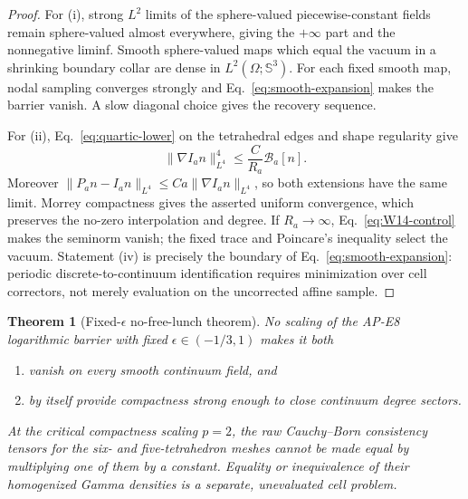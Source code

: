 \documentclass[11pt]{article}
\numberwithin{equation}{section}
\newtheorem{theorem}{Theorem}[section]
\theoremstyle{definition}
\theoremstyle{remark}
\newcommand{\SSS}{\mathbb S}
\newcommand{\cB}{\mathcal B}
\begin{document}
\begin{proof}
For (i), strong $L^2$ limits of the sphere-valued piecewise-constant fields
remain sphere-valued almost everywhere, giving the $+\infty$ part and the
nonnegative liminf.  Smooth sphere-valued maps which equal the vacuum in a
shrinking boundary collar are dense in $L^2(\Omega;\SSS^3)$.  For each fixed
smooth map, nodal sampling converges strongly and
Eq.~\eqref{eq:smooth-expansion} makes the barrier vanish.  A slow diagonal
choice gives the recovery sequence.

For (ii), Eq.~\eqref{eq:quartic-lower} on the tetrahedral edges and shape
regularity give
\begin{equation}
 \|\nabla I_an\|_{L^4}^4
 \le \frac{C}{R_a}\cB_a[n].
 \label{eq:W14-control}
\end{equation}
Moreover
$\|P_an-I_an\|_{L^4}\le Ca\|\nabla I_an\|_{L^4}$, so both extensions have
the same limit.  Morrey compactness gives the asserted uniform convergence,
which preserves the no-zero interpolation and degree.  If $R_a\to\infty$,
Eq.~\eqref{eq:W14-control} makes the seminorm vanish; the fixed trace and
Poincare's inequality select the vacuum.  Statement (iv) is precisely the
boundary of Eq.~\eqref{eq:smooth-expansion}: periodic discrete-to-continuum
identification requires minimization over cell correctors, not merely
evaluation on the uncorrected affine sample.
\end{proof}

\begin{theorem}[Fixed-$\epsilon$ no-free-lunch theorem]
No scaling of the AP-E8 logarithmic barrier with fixed
$\epsilon\in(-1/3,1)$ makes it both

\begin{enumerate}[label=(\alph*)]
\item vanish on every smooth continuum field, and
\item by itself provide compactness strong enough to close continuum degree
sectors.
\end{enumerate}

At the critical compactness scaling $p=2$, the raw Cauchy--Born consistency
tensors for the six- and five-tetrahedron meshes cannot be made equal by
multiplying one of them by a constant.  Equality or inequivalence of their
homogenized Gamma densities is a separate, unevaluated cell problem.
\end{theorem}
\end{document}

